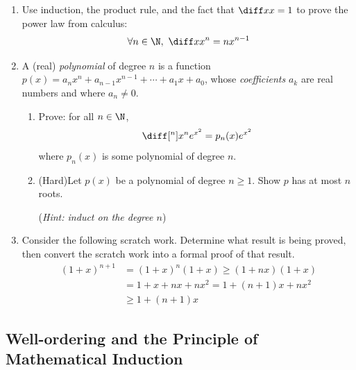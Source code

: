 \begin{exercises}{}{}
\begin{enumerate}
		\item Use induction, the product rule, and the fact that $\diff xx=1$ to prove the power law from calculus:
		\[
	    \forall n\in\N,\ \diff x x^n =nx^{n-1}
		\]


		\item A (real) \emph{polynomial} of degree $n$ is a function $p(x)=a_nx^n+a_{n-1}x^{n-1}+ \cdots +a_1x+a_0$, whose \emph{coefficients} $a_k$ are real numbers and where $a_n\neq 0$.
		\begin{enumerate}
    	\item Prove: for all $n\in\N$,
    	\[
        \diff[{}^n]{x^n} e^{x^2} = p_n(x) e^{x^2}
    	\]
    	where $p_n(x)$ is some polynomial of degree $n$.

			\item (Hard)\lstsp Let $p(x)$ be a polynomial of degree $n\ge 1$. Show $p$ has at most $n$ roots.\par
			(\emph{Hint: induct on the degree $n$})
		\end{enumerate}


		\item Consider the following scratch work. Determine what result is being proved, then convert the scratch work into a formal proof of that result.
	  \begin{align*}
	    (1+x)^{n+1}&=(1+x)^n(1+x)\ge (1+nx)(1+x)\\
	    &=1+x+nx+nx^2=1+(n+1)x+nx^2\\
	    &\ge 1+(n+1)x
	  \end{align*}
	\end{enumerate}

\end{exercises}

\clearpage

\iffalse


\subsection{Well-ordering and the Principle of Mathematical Induction}\label{sec:wellorder}



